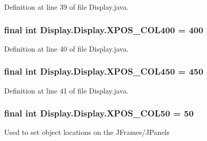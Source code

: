 Definition at line 39 of file Display.\+java.

\hypertarget{class_display_1_1_display_a2b04669828dc32ce7435f60985fb9e15}{}
\subsubsection[{X\+P\+O\+S\+\_\+\+C\+O\+L400}]{\setlength{\rightskip}{0pt plus 5cm}final int Display.\+Display.\+X\+P\+O\+S\+\_\+\+C\+O\+L400 = 400\hspace{0.3cm}{\ttfamily [static]}}\label{class_display_1_1_display_a2b04669828dc32ce7435f60985fb9e15}


Definition at line 40 of file Display.\+java.

\hypertarget{class_display_1_1_display_aaa4a147d3ae20ff69293868c15b0810c}{}
\subsubsection[{X\+P\+O\+S\+\_\+\+C\+O\+L450}]{\setlength{\rightskip}{0pt plus 5cm}final int Display.\+Display.\+X\+P\+O\+S\+\_\+\+C\+O\+L450 = 450\hspace{0.3cm}{\ttfamily [static]}}\label{class_display_1_1_display_aaa4a147d3ae20ff69293868c15b0810c}


Definition at line 41 of file Display.\+java.

\hypertarget{class_display_1_1_display_a044af84b350b1be71c612ab3b534e24d}{}
\subsubsection[{X\+P\+O\+S\+\_\+\+C\+O\+L50}]{\setlength{\rightskip}{0pt plus 5cm}final int Display.\+Display.\+X\+P\+O\+S\+\_\+\+C\+O\+L50 = 50\hspace{0.3cm}{\ttfamily [static]}}\label{class_display_1_1_display_a044af84b350b1be71c612ab3b534e24d}
Used to set object locations on the J\+Frames/\+J\+Panels 

